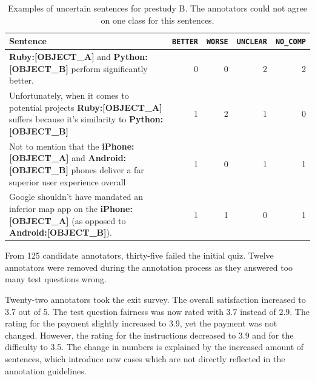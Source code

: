 \begin{table}[tp]
\centering
\caption{Examples of uncertain sentences for prestudy B. The annotators could not agree on one class for this sentences. }
\label{tbl:pre_2_res}
\begin{tabularx}{\textwidth}{Xrrrr}
\toprule
 Sentence        & \texttt{BETTER} & \texttt{WORSE} & \texttt{UNCLEAR} & \texttt{NO\_COMP}          \\ \midrule
\textbf{{\color[HTML]{9A14B2}Ruby:{[}OBJECT\_A{]}}} and \textbf{{\color[HTML]{6CB219} Python:{[}OBJECT\_B{]}}} perform significantly better. & 0 & 0 & 2 & 2 \\

Unfortunately, when it comes to potential projects \textbf{{\color[HTML]{9A14B2}Ruby:{[}OBJECT\_A{]}}} suffers because it's similarity to \textbf{{\color[HTML]{6CB219} Python:{[}OBJECT\_B{]}}} & 1 & 2 & 1 & 0 \\


Not to mention that the \textbf{{\color[HTML]{9A14B2}iPhone:{[}OBJECT\_A{]}}} and \textbf{{\color[HTML]{6CB219} Android:{[}OBJECT\_B{]}}} phones deliver a far superior user experience overall & 1 & 0 & 1 & 1 \\

Google shouldn't have mandated an inferior map app on the \textbf{{\color[HTML]{9A14B2}iPhone:{[}OBJECT\_A{]}}} (as opposed to \textbf{{\color[HTML]{6CB219} Android:{[}OBJECT\_B{]}}}). & 1 & 1 & 0 & 1 \\



\bottomrule                              
\end{tabularx}
\end{table}

 \FloatBarrier
From 125 candidate annotators, thirty-five failed the initial quiz. Twelve annotators were removed during the annotation process as they answered too many test questions wrong.

Twenty-two annotators took the exit survey. The overall satisfaction increased to 3.7 out of 5. The test question fairness was now rated with 3.7  instead of 2.9. The rating for the payment slightly increased to 3.9, yet the payment was not changed. However, the rating for the instructions decreased to 3.9 and for the difficulty to 3.5.
The change in numbers is explained by the increased amount of sentences, which introduce new cases which are not directly reflected in the annotation guidelines.

